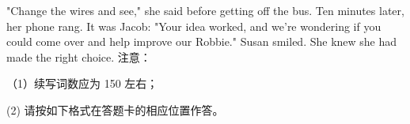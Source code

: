 \documentclass{英语试卷}
\begin{document}
\par "Change the wires and see," she said before getting off the bus. Ten minutes later, her phone rang. It was Jacob: "Your idea worked, and we’re wondering if you could come over and help improve our Robbie." Susan smiled. She knew she had made the right choice. 注意：\par
\par （1）续写词数应为 150 左右；\par
\par (2) 请按如下格式在答题卡的相应位置作答。\par
{}
\end{document}
